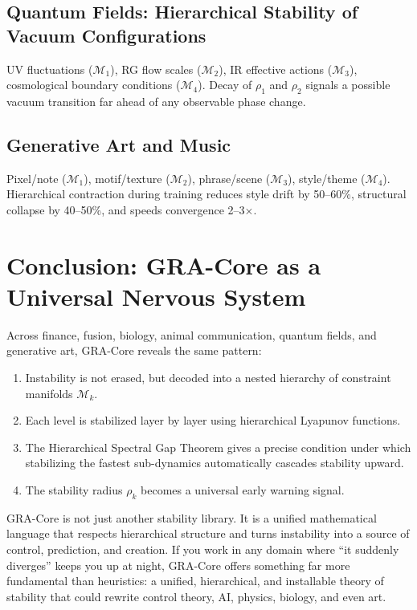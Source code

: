 \documentclass[11pt,a4paper]{article}
\begin{document}
\subsection{Quantum Fields: Hierarchical Stability of Vacuum Configurations}
UV fluctuations ($\mathcal{M}_1$), RG flow scales ($\mathcal{M}_2$), IR effective actions ($\mathcal{M}_3$), cosmological boundary conditions ($\mathcal{M}_4$). Decay of $\rho_1$ and $\rho_2$ signals a possible vacuum transition far ahead of any observable phase change.

\subsection{Generative Art and Music}
Pixel/note ($\mathcal{M}_1$), motif/texture ($\mathcal{M}_2$), phrase/scene ($\mathcal{M}_3$), style/theme ($\mathcal{M}_4$). Hierarchical contraction during training reduces style drift by 50--60\%, structural collapse by 40--50\%, and speeds convergence 2--3$\times$.

\section{Conclusion: GRA-Core as a Universal Nervous System}
Across finance, fusion, biology, animal communication, quantum fields, and generative art, GRA-Core reveals the same pattern:
\begin{enumerate}[noitemsep]
    \item Instability is not erased, but decoded into a nested hierarchy of constraint manifolds $\mathcal{M}_k$.
    \item Each level is stabilized layer by layer using hierarchical Lyapunov functions.
    \item The Hierarchical Spectral Gap Theorem gives a precise condition under which stabilizing the fastest sub-dynamics automatically cascades stability upward.
    \item The stability radius $\rho_k$ becomes a universal early warning signal.
\end{enumerate}

GRA-Core is not just another stability library. It is a unified mathematical language that respects hierarchical structure and turns instability into a source of control, prediction, and creation. If you work in any domain where ``it suddenly diverges'' keeps you up at night, GRA-Core offers something far more fundamental than heuristics: a unified, hierarchical, and installable theory of stability that could rewrite control theory, AI, physics, biology, and even art.
\end{document}
